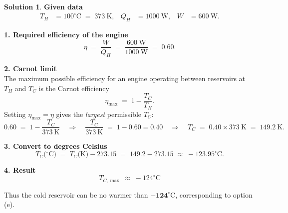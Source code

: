 \documentclass[12pt]{article}
\theoremstyle{definition} %
\newtheorem{solution}{Solution}
\theoremstyle{plain} %
\begin{document}
        \begin{solution}
          \textbf{Given data}\\
          \begin{align*}
          T_H &= 100^{\circ}\mathrm{C} \;=\; 373\ \mathrm{K}, &
          Q_H &= 1000\ \mathrm{W}, &
          W   &= 600\ \mathrm{W}.
          \end{align*}
          
          \textbf{1. Required efficiency of the engine}\\
          \[
          \eta \;=\; \frac{W}{Q_H}
                 \;=\;\frac{600\ \mathrm{W}}{1000\ \mathrm{W}}
                 \;=\; 0.60.
          \]
          
          \textbf{2. Carnot limit}\\
          The maximum possible efficiency for an engine operating between
          reservoirs at \(T_H\) and \(T_C\) is the Carnot efficiency
          \[
          \eta_{\max} \;=\; 1 - \frac{T_C}{T_H}.
          \]
          Setting \(\eta_{\max} = \eta\) gives the \emph{largest} permissible \(T_C\):
          \[
          0.60 \;=\; 1 - \frac{T_C}{373\ \mathrm{K}}
          \quad\Longrightarrow\quad
          \frac{T_C}{373\ \mathrm{K}} \;=\; 1 - 0.60 = 0.40
          \quad\Longrightarrow\quad
          T_C \;=\; 0.40 \times 373\ \mathrm{K} \;=\; 149.2\ \mathrm{K}.
          \]
          
          \textbf{3. Convert to degrees Celsius}\\
          \[
          T_C\bigl({}^{\circ}\mathrm{C}\bigr)
             \;=\; T_C\bigl(\mathrm{K}\bigr) - 273.15
             \;=\; 149.2 - 273.15
             \;\approx\; -123.95^{\circ}\mathrm{C}.
          \]
          
          \textbf{4. Result}\\
          \[
          \boxed{T_{C,\max} \;\approx\; -124^{\circ}\mathrm{C}}
          \]
          
          Thus the cold reservoir can be no warmer than \(\mathbf{-124^{\circ}\mathrm{C}}\),
          corresponding to option (e).
          \end{solution}
\end{document}
